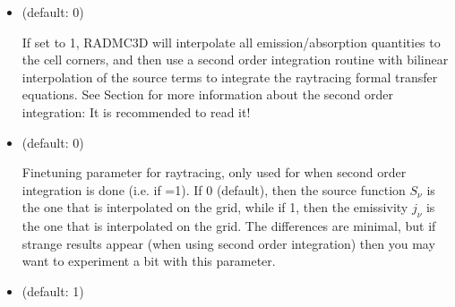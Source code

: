 \documentclass[letterpaper,10pt,english]{sphinxmanual}
\begin{document}
\begin{itemize}
Setting this to 1 forces RADMC\sphinxhyphen{}3D to write out a file called
 which contains four columns, for respectivly:
, i.e. the pixel position and its size. This is for all
pixels, including the sub\sphinxhyphen{}pixels created during the recursive subpixeling
procedure (Section {\hyperref[\detokenize{imagesspectra:sec-recursive-subpixeling}]{}}). This allows the user to
find out if the recursive subpixeling went well or if certain areas were
over/under\sphinxhyphen{}resolved. This is really only meant as a diagnostic.

\item {} 
 (default: 0)

If set to 1, RADMC\sphinxhyphen{}3D will interpolate all emission/absorption quantities
to the cell corners, and then use a second order integration routine with
bilinear interpolation of the source terms to integrate the ray\sphinxhyphen{}tracing
formal transfer equations. See Section {\hyperref[\detokenize{imagesspectra:sec-second-order}]{}} for more
information about the second order integration: It is recommended to
read it!

\item {} 
 (default: 0) 

Fine\sphinxhyphen{}tuning parameter for ray\sphinxhyphen{}tracing, only used for when second order
integration is done (i.e. if =1). If 0
(default), then the source function \(S_\nu\) is the one that is
interpolated on the grid, while if 1, then the emissivity \(j_\nu\) is the
one that is interpolated on the grid. The differences are minimal, but
if strange results appear (when using second order integration) then you
may want to experiment a bit with this parameter.

\item {} 
 (default: 1) 


\end{itemize}
\end{document}
